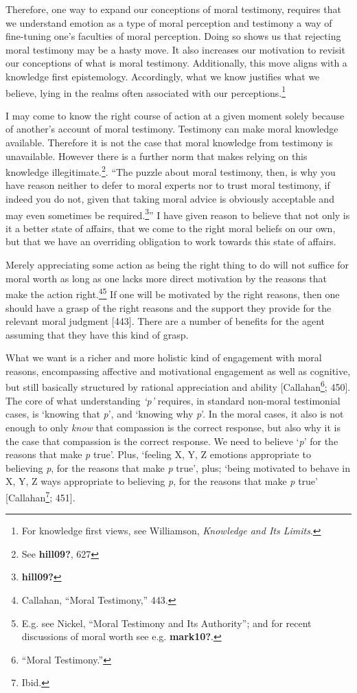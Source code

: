 \documentclass[phdthesis,12pt,final]{wuthesis}
\theoremstyle{definition}
\theoremstyle{definition}
\theoremstyle{definition}
\theoremstyle{definition}
\theoremstyle{remark}
\begin{document}
Therefore, one way to expand our conceptions of moral testimony, requires that we understand emotion as a type of moral perception and testimony a way of fine-tuning one's faculties of moral perception. Doing so shows us that rejecting moral testimony may be a hasty move. It also increases our motivation to revisit our conceptions of what is moral testimony. Additionally, this move aligns with a knowledge first epistemology. Accordingly, what we know justifies what we believe, lying in the realms often associated with our perceptions.\footnote{For knowledge first views, see Williamson, \emph{Knowledge and {Its Limits}}.}

I may come to know the right course of action at a given moment solely because of another's account of moral testimony. Testimony can make moral knowledge available. Therefore it is not the case that moral knowledge from testimony is unavailable. However there is a further norm that makes relying on this knowledge illegitimate.\footnote{See \textbf{hill09?}, 627}. ``The puzzle about moral testimony, then, is why you have reason neither to defer to moral experts nor to trust moral testimony, if indeed you do not, given that taking moral advice is obviously acceptable and may even sometimes be required.\footnote{\textbf{hill09?}}'' I have given reason to believe that not only is it a better state of affairs, that we come to the right moral beliefs on our own, but that we have an overriding obligation to work towards this state of affairs.

Merely appreciating some action as being the right thing to do will not suffice for moral worth as long as one lacks more direct motivation by the reasons that make the action right.\footnote{Callahan, {``Moral {Testimony},''} 443.}\footnote{E.g. see Nickel, {``Moral {Testimony} and Its {Authority}''}; and for recent discussions of moral worth see e.g. \textbf{mark10?}.} If one will be motivated by the right reasons, then one should have a grasp of the right reasons and the support they provide for the relevant moral judgment {[}443{]}. There are a number of benefits for the agent assuming that they have this kind of grasp.

What we want is a richer and more holistic kind of engagement with moral reasons, encompassing affective and motivational engagement as well as cognitive, but still basically structured by rational appreciation and ability {[}Callahan\footnote{{``Moral {Testimony}.''}}; 450{]}. The core of what understanding \emph{`p'} requires, in standard non-moral testimonial cases, is `knowing that \emph{p}', and `knowing why \emph{p}'. In the moral cases, it also is not enough to only \emph{know} that compassion is the correct response, but also why it is the case that compassion is the correct response. We need to believe `\emph{p}' for the reasons that make \emph{p} true'. Plus, `feeling X, Y, Z emotions appropriate to believing \emph{p}, for the reasons that make \emph{p} true', plus; `being motivated to behave in X, Y, Z ways appropriate to believing \emph{p}, for the reasons that make \emph{p} true' {[}Callahan\footnote{Ibid.}; 451{]}.
\end{document}
